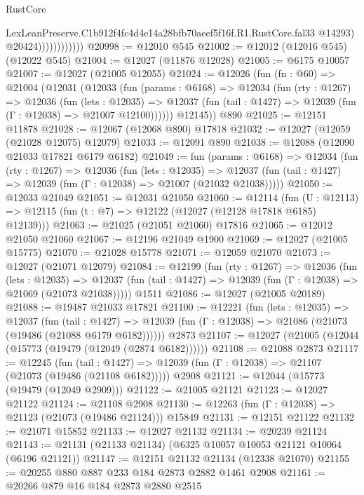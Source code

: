 \begin{lexlean}{RustCore}
\begin{coremodule}
                              LexLeanPreserve.C1b912f4fc4d4e14a28bfb70aeef5f16f.R1.RustCore.fal33
                              @14293)
                            @20424))))))))))))
@20998 := @12010 @545
@21002 := @12012 (@12016 @545) (@12022 @545)
@21004 := @12027 (@11876 @12028)
@21005 := @6175 @10057
@21007 := @12027 (@21005 @12055)
@21024 := @12026
    (fun (fn : @60) =>
    @21004
      (@12031
        (@12033
          (fun (params : @6168) =>
          @12034
            (fun (rty : @1267) =>
            @12036
              (fun (lets : @12035) =>
              @12037 (fun (tail : @1427) => @12039 (fun (Γ : @12038) => @21007 @12100))))))
        @12145))
    @890
@21025 := @12151 @11878
@21028 := @12067 (@12068 @890) @17818
@21032 := @12027 (@12059 (@21028 @12075) @12079)
@21033 := @12091 @890
@21038 := @12088 (@12090 @21033 @17821 @6179 @6182)
@21049 := fun (params : @6168) =>
  @12034
    (fun (rty : @1267) =>
    @12036
      (fun (lets : @12035) =>
      @12037 (fun (tail : @1427) => @12039 (fun (Γ : @12038) => @21007 (@21032 @21038)))))
@21050 := @12033 @21049
@21051 := @12031 @21050
@21060 := @12114
    (fun (U : @12113) => @12115 (fun (t : @7) => @12122 (@12027 (@12128 @17818 @6185) @12139)))
@21063 := @21025 (@21051 @21060) @17816
@21065 := @12012 @21050 @21060
@21067 := @12196 @21049 @1900
@21069 := @12027 (@21005 @15775)
@21070 := @21028 @15778
@21071 := @12059 @21070
@21073 := @12027 (@21071 @12079)
@21084 := @12199
    (fun (rty : @1267) =>
    @12036
      (fun (lets : @12035) =>
      @12037 (fun (tail : @1427) => @12039 (fun (Γ : @12038) => @21069 (@21073 @21038)))))
    @1511
@21086 := @12027 (@21005 @20189)
@21088 := @19487 @21033 @17821
@21100 := @12221
    (fun (lets : @12035) =>
    @12037
      (fun (tail : @1427) =>
      @12039 (fun (Γ : @12038) => @21086 (@21073 (@19486 (@21088 @6179 @6182))))))
    @2873
@21107 := @12027 (@21005 (@12044 (@15773 (@19479 (@12049 (@2874 @6182))))))
@21108 := @21088 @2873
@21117 := @12245
    (fun (tail : @1427) => @12039 (fun (Γ : @12038) => @21107 (@21073 (@19486 (@21108 @6182)))))
    @2908
@21121 := @12044 (@15773 (@19479 (@12049 @2909)))
@21122 := @21005 @21121
@21123 := @12027 @21122
@21124 := @21108 @2908
@21130 := @12263 (fun (Γ : @12038) => @21123 (@21073 (@19486 @21124))) @15849
@21131 := @12151 @21122
@21132 := @21071 @15852
@21133 := @12027 @21132
@21134 := @20239 @21124
@21143 := @21131 (@21133 @21134) (@6325 @10057 @10053 @21121 @10064 (@6196 @21121))
@21147 := @12151 @21132 @21134 (@12338 @21070)
@21155 := @20255 @880 @887 @233 @184 @2873 @2882 @1461 @2908
@21161 := @20266 @879 @16 @184 @2873 @2880 @2515

\end{coremodule}
\end{lexlean}
